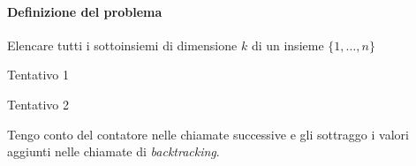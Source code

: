 \newpage
\paragraph{Definizione del problema}
Elencare tutti i sottoinsiemi di dimensione \(k\) di un insieme \(\{1, \dots, n\}\)

\begin{minipage}[t]{.5\textwidth}
	\begin{algorithm}[H]
	\caption{Tentativo 1}


	\end{algorithm}
\end{minipage}%
\begin{minipage}[t]{.5\textwidth}
	\begin{algorithm}[H]
	\caption{Tentativo 2}


	\end{algorithm}
	Tengo conto del contatore nelle chiamate successive e gli sottraggo i valori aggiunti nelle chiamate di \emph{backtracking}.
\end{minipage}

